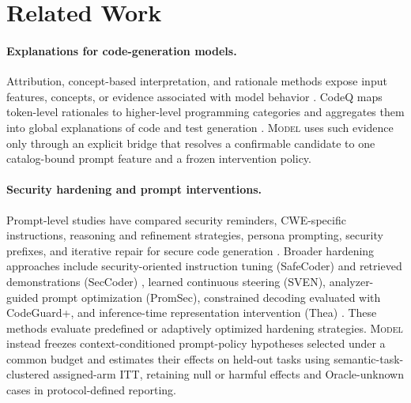 \documentclass[acmsmall,screen,review,anonymous]{acmart}
\newcommand{\model}{\textsc{Model}\xspace}
\begin{document}
\section{Related Work}

\paragraph{Explanations for code-generation models.}
Attribution, concept-based interpretation, and rationale methods expose input
features, concepts, or evidence associated with model behavior
\cite{sundararajan2017integrated,kim2018tcav,lundberg2017shap,
deyoung2020eraser}.
CodeQ maps token-level rationales to higher-level programming categories and
aggregates them into global explanations of code and test generation
\cite{khati2026codeq}.
\model uses such evidence only through an explicit bridge that resolves a
confirmable candidate to one catalog-bound prompt feature and a frozen
intervention policy.

\paragraph{Security hardening and prompt interventions.}
Prompt-level studies have compared security reminders, CWE-specific
instructions, reasoning and refinement strategies, persona prompting, security
prefixes, and iterative repair for secure code generation
\cite{tony2025prompting,bruni2025promptbenchmark}.
Broader hardening approaches include security-oriented instruction tuning
(SafeCoder) and retrieved demonstrations (SecCoder)
\cite{he2024safecoder,zhang2024seccoder}, learned continuous steering (SVEN),
analyzer-guided prompt optimization (PromSec), constrained decoding evaluated
with CodeGuard+, and inference-time representation intervention (Thea)
\cite{he2023sven,nazzal2024promsec,fu2024codeguard,
elhusseini2026thea}.
These methods evaluate predefined or adaptively optimized hardening
strategies. \model instead freezes context-conditioned prompt-policy
hypotheses selected under a common budget and estimates their effects on
held-out tasks using semantic-task-clustered assigned-arm ITT, retaining null
or harmful effects and Oracle-unknown cases in protocol-defined reporting.
\end{document}
